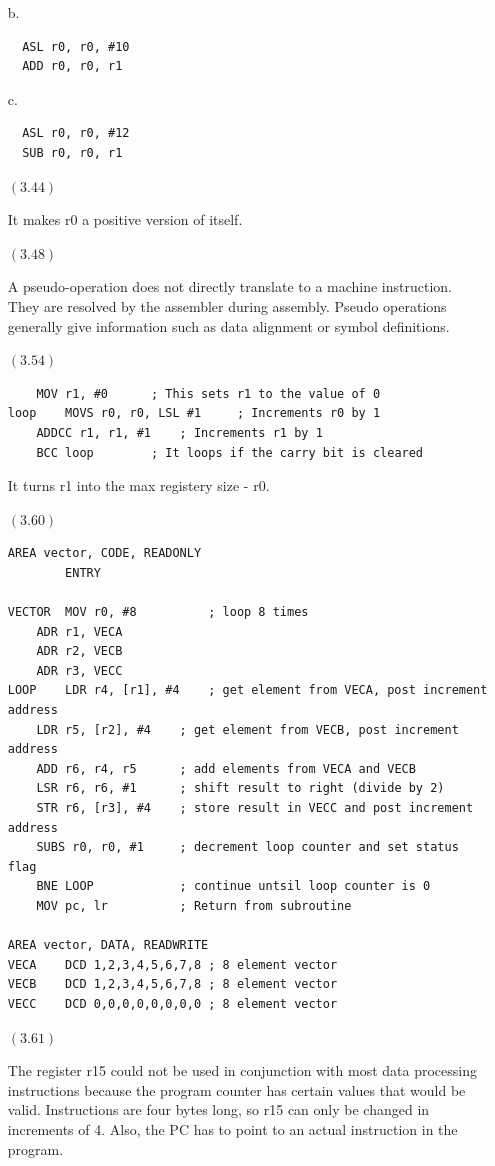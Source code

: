 \documentclass[letterpaper,10pt,titlepage]{article}
\begin{document}
\begin{enumerate}
  b. 
  \begin{lstlisting}
  ASL r0, r0, #10
  ADD r0, r0, r1
  \end{lstlisting}
  
  c. 
  \begin{lstlisting}
  ASL r0, r0, #12
  SUB r0, r0, r1
  \end{lstlisting}

\item[$(3.44)$]

  It makes r0 a positive version of itself.

\item[$(3.48)$]

  A pseudo-operation does not directly translate to a machine instruction.  They are resolved by the assembler during assembly.
  Pseudo operations generally give information such as data alignment or symbol definitions.
  
\item[$(3.54)$]

\begin{lstlisting}
	MOV r1, #0 		; This sets r1 to the value of 0
loop	MOVS r0, r0, LSL #1 	; Increments r0 by 1
	ADDCC r1, r1, #1	; Increments r1 by 1
	BCC loop		; It loops if the carry bit is cleared
\end{lstlisting}

  It turns r1 into the max registery size - r0.

\item[$(3.60)$]

\begin{lstlisting}
AREA vector, CODE, READONLY
		ENTRY

VECTOR	MOV r0, #8			; loop 8 times
	ADR r1, VECA
	ADR r2, VECB
	ADR r3, VECC
LOOP	LDR r4, [r1], #4	; get element from VECA, post increment address
	LDR r5, [r2], #4	; get element from VECB, post increment address
	ADD r6, r4, r5		; add elements from VECA and VECB
	LSR r6, r6, #1		; shift result to right (divide by 2)
	STR r6, [r3], #4	; store result in VECC and post increment address
	SUBS r0, r0, #1		; decrement loop counter and set status flag
	BNE LOOP			; continue untsil loop counter is 0
	MOV pc, lr			; Return from subroutine
		
AREA vector, DATA, READWRITE
VECA	DCD 1,2,3,4,5,6,7,8 ; 8 element vector
VECB	DCD 1,2,3,4,5,6,7,8 ; 8 element vector
VECC	DCD 0,0,0,0,0,0,0,0 ; 8 element vector
\end{lstlisting}
  
\item[$(3.61)$]

  The register r15 could not be used in conjunction with most data processing instructions because the program counter has certain values that would be valid.
  Instructions are four bytes long, so r15 can only be changed in increments of 4.  Also, the PC has to point to an actual instruction in the program.
  
\end{enumerate}
\end{document}
